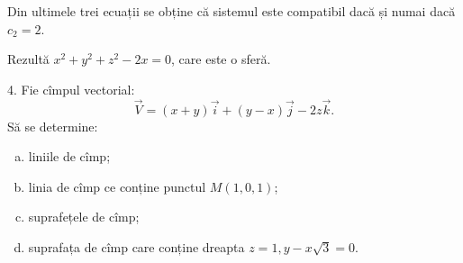 Din ultimele trei ecuații se obține că sistemul este compatibil dacă și numai dacă $ c_2 = 2 $.

Rezultă $ x^2 + y^2 + z^2 - 2x = 0 $, care este o sferă.

\vspace{1cm}

4. Fie cîmpul vectorial:
\[
  \vec{V} = (x + y)\vec{i} + (y - x)\vec{j} - 2z\vec{k}.
\]
Să se determine:
\begin{enumerate}[(a)]
\item liniile de cîmp;
\item linia de cîmp ce conține punctul $ M(1, 0, 1) $;
\item suprafețele de cîmp;
\item suprafața de cîmp care conține dreapta $ z = 1, y - x\sqrt{3} = 0 $.
\end{enumerate}

